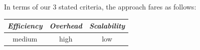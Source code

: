 %
%
%
%
%
%
In terms of our $3$ stated criteria, the approach fares as follows:
\begin{center}
{\footnotesize
\begin{tabular}{ccc}
\emph{Efficiency} & \emph{Overhead} & \emph{Scalability} \\
\hline
medium &
high &
low
\end{tabular}
}
\end{center}


